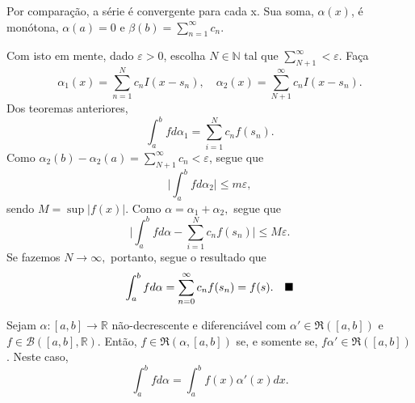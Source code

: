 \documentclass[analysis_notes.tex]{subfiles}
\begin{document}
\begin{proof*}
	Por comparação, a série é convergente para cada x. Sua soma, \(\alpha (x)\), é monótona, \(\alpha (a) = 0\) e \(\beta (b) = \sum\limits_{n=1}^{\infty}c_{n}.\)

	Com isto em mente, dado \(\varepsilon > 0\), escolha \(N\in \mathbb{N}\) tal que \(\sum\limits_{N+1}^{\infty} < \varepsilon \). Faça
	\[
		\alpha _1(x) = \sum\limits_{n=1}^{N}c_{n}I(x-s_{n}),\quad \alpha _2(x) = \sum\limits_{N+1}^{\infty}c_{n}I(x-s_{n}).
	\]
	Dos teoremas anteriores,
	\[
		\int_{a}^{b}fd\alpha_1 = \sum\limits_{i=1}^{N}c_{n}f(s_{n}).
	\]
	Como \(\alpha _2(b) - \alpha _2(a) = \sum\limits_{N+1}^{\infty}c_{n} < \varepsilon \), segue que
	\[
		\biggl\vert \int_{a}^{b}f d\alpha_2 \biggr\vert \leq m\varepsilon ,
	\]
	sendo \(M = \sup{|f(x)|}\). Como \(\alpha = \alpha _1 + \alpha _2, \) segue que
	\[
		\biggl\vert \int_{a}^{b}fd\alpha  - \sum\limits_{i=1}^{N}c_{n}f(s_{n}) \biggr\vert\leq M\varepsilon .
	\]
	Se fazemos \(N\to \infty,\) portanto, segue o resultado que
	\[
		\int_{a}^{b}f d\alpha = \sum\limits_{n=0}^{\infty}c_{n}f(s_{n}) = f(s).\quad \text{$\blacksquare$}
	\]
\end{proof*}
\begin{theorem*}
	Sejam \(\alpha :[a, b]\rightarrow \mathbb{R}\) não-decrescente e diferenciável com \(\alpha '\in \mathfrak{R}([a, b])\) e \(f\in \mathcal{B}([a, b], \mathbb{R})\). Então, \(f\in \mathfrak{R}(\alpha , [a, b])\) se, e somente se,
	\(f\alpha '\in \mathfrak{R}([a, b])\). Neste caso,
	\[
		\int_{a}^{b}fd\alpha = \int_{a}^{b}f(x)\alpha'(x) dx.
	\]
\end{theorem*}
\end{document}
